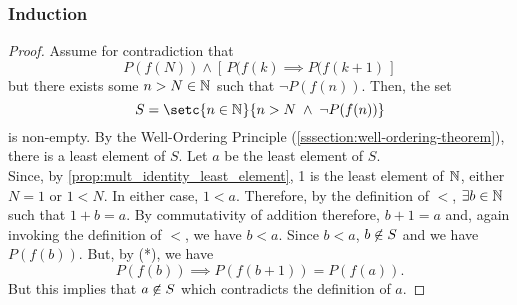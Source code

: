 \documentclass[../MathsNotesBase.tex]{subfiles}
\begin{document}
{		
		
		\biggerskip
		\subsubsection{Induction}
		\bigskip
		\begin{proof}
			Assume for contradiction that
			\[ P(f(N)) \land [\, P(f(k) \implies P(f(k+1) \,] \tag{*} \]
			but there exists some ${ n > N \in \mathbb{N}^{} }$ such that ${ \lnot P(f(n)) }$. Then, the set
			\[ S = \setc{n \in \N{}}{ n > N \; \land \; \lnot P(f(n)) } \]
			is non-empty. By the Well-Ordering Principle (\ref{sssection:well-ordering-theorem}), there is a least element of $S$. Let $a$ be the least element of $S$.\\
			
			Since, by \autoref{prop:mult_identity_least_element}, 1 is the least element of $\mathbb{N}^{}$, either ${ N = 1 }$ or ${ 1 < N }$. In either case, ${ 1 < a }$. Therefore, by the definition of $<$, ${ \exists b \in \mathbb{N}^{} }$ such that ${ 1 + b = a }$. By commutativity of addition therefore, ${ b + 1 = a }$ and, again invoking the definition of $<$, we have ${ b < a }$. Since ${ b < a }$, ${ b \centernot\in S }$ and we have ${ P(f(b)) }$. But, by (*), we have
			\[ P(f(b)) \implies P(f(b+1)) = P(f(a)). \]
			But this implies that ${ a \centernot\in S }$ which contradicts the definition of $a$.
		\end{proof}
	}




\pagebreak

	
	
\end{document}
